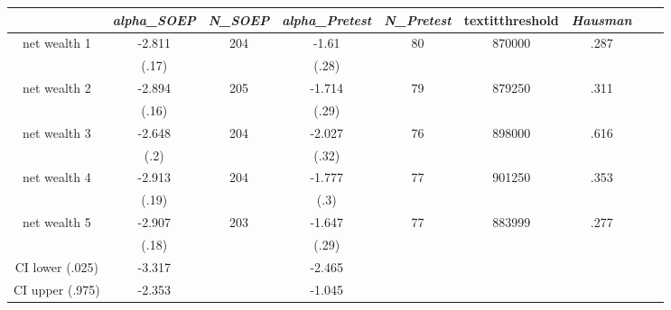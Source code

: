 \begin{tabular}{ccccccccc}
\hline \textit{}&   \textit{alpha\_SOEP}&   \textit{N\_SOEP}&       \textit{alpha\_Pretest}&        \textit{N\_Pretest}&    textit{threshold}&      \textit{Hausman}\\ \hline
net wealth 1&-2.811&204&-1.61&80&870000&.287\\
&(.17)&&(.28)&&&\\
net wealth 2&-2.894&205&-1.714&79&879250&.311\\
&(.16)&&(.29)&&&\\
net wealth 3&-2.648&204&-2.027&76&898000&.616\\
&(.2)&&(.32)&&&\\
net wealth 4&-2.913&204&-1.777&77&901250&.353\\
&(.19)&&(.3)&&&\\
net wealth 5&-2.907&203&-1.647&77&883999&.277\\
&(.18)&&(.29)&&&\\
CI lower (.025)&-3.317&&-2.465&&&\\
CI upper (.975)&-2.353&&-1.045&&&\\
\hline \end{tabular}
